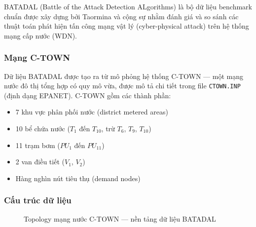 BATADAL (Battle of the Attack Detection ALgorithms) là bộ dữ liệu benchmark chuẩn
được xây dựng bởi Taormina và cộng sự \cite{taormina2018batadal} nhằm đánh giá và
so sánh các thuật toán phát hiện tấn công mạng vật lý (cyber-physical attack) trên
hệ thống mạng cấp nước (WDN).

\subsubsection{Mạng C-TOWN}

Dữ liệu BATADAL được tạo ra từ mô phỏng hệ thống C-TOWN --- một mạng nước đô thị
tổng hợp có quy mô vừa, được mô tả chi tiết trong file \texttt{CTOWN.INP} (định dạng
EPANET). C-TOWN gồm các thành phần:

\begin{itemize}
  \item 7 khu vực phân phối nước (district metered areas)
  \item 10 bể chứa nước ($T_1$ đến $T_{10}$, trừ $T_6$, $T_9$, $T_{10}$)
  \item 11 trạm bơm ($PU_1$ đến $PU_{11}$)
  \item 2 van điều tiết ($V_1$, $V_2$)
  \item Hàng nghìn nút tiêu thụ (demand nodes)
\end{itemize}

\subsubsection{Cấu trúc dữ liệu}

\begin{figure}[H]
  \centering
  \setlength{\fboxsep}{12pt}
  \caption{Topology mạng nước C-TOWN --- nền tảng dữ liệu BATADAL}
  \label{fig:ctown-network}
\end{figure}

